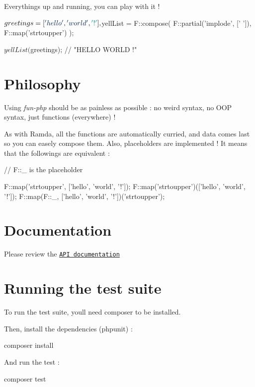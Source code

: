 Everything\textquotesingle{}s up and running, you can play with it !


\begin{DoxyCode}
$greetings = [\textcolor{stringliteral}{'hello'}, \textcolor{stringliteral}{'world'}, \textcolor{charliteral}{'!'}],

$yellList = F::compose(
  F::partial(\textcolor{stringliteral}{'implode'}, [\textcolor{charliteral}{' '}]),
  F::map(\textcolor{stringliteral}{'strtoupper'})
);

$yellList($greetings); \textcolor{comment}{// "HELLO WORLD !"}
\end{DoxyCode}


\section*{Philosophy}

Using {\itshape fun-\/php} should be as painless as possible \+: no weird syntax, no O\+OP syntax, just functions (everywhere) !

As with Ramda, all the functions are automatically curried, and data comes last so you can easely compose them. Also, placeholders are implemented ! It means that the followings are equivalent \+:


\begin{DoxyCode}
\textcolor{comment}{// F::\_ is the placeholder}

F::map(\textcolor{stringliteral}{'strtoupper'}, [\textcolor{stringliteral}{'hello'}, \textcolor{stringliteral}{'world'}, \textcolor{charliteral}{'!'}]);
F::map(\textcolor{stringliteral}{'strtoupper'})([\textcolor{stringliteral}{'hello'}, \textcolor{stringliteral}{'world'}, \textcolor{charliteral}{'!'}]);
F::map(F::\_, [\textcolor{stringliteral}{'hello'}, \textcolor{stringliteral}{'world'}, \textcolor{charliteral}{'!'}])(\textcolor{stringliteral}{'strtoupper'});
\end{DoxyCode}


\section*{Documentation}

Please review the \href{/fun-php/classboehm__s_1_1F.html#a1712c41e5be41e6f6e2088ed5d54a864}{\tt A\+PI documentation}

\section*{Running the test suite}

To run the test suite, you\textquotesingle{}ll need {\ttfamily composer} to be installed.

Then, install the dependencies (phpunit) \+:


\begin{DoxyCode}
composer install
\end{DoxyCode}


And run the test \+:


\begin{DoxyCode}
composer test
\end{DoxyCode}
 